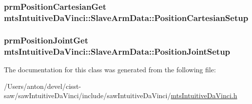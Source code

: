 \subsubsection[{Position\+Cartesian\+Setup}]{\setlength{\rightskip}{0pt plus 5cm}prm\+Position\+Cartesian\+Get mts\+Intuitive\+Da\+Vinci\+::\+Slave\+Arm\+Data\+::\+Position\+Cartesian\+Setup}\label{classmts_intuitive_da_vinci_1_1_slave_arm_data_a09a328a245e9ccf2d482941fba0c76bc}
\hypertarget{classmts_intuitive_da_vinci_1_1_slave_arm_data_a9510d583a4decfbd25c027bf7c1e3e15}{}
\subsubsection[{Position\+Joint\+Setup}]{\setlength{\rightskip}{0pt plus 5cm}prm\+Position\+Joint\+Get mts\+Intuitive\+Da\+Vinci\+::\+Slave\+Arm\+Data\+::\+Position\+Joint\+Setup}\label{classmts_intuitive_da_vinci_1_1_slave_arm_data_a9510d583a4decfbd25c027bf7c1e3e15}


The documentation for this class was generated from the following file\+:\begin{DoxyCompactItemize}
\item 
/\+Users/anton/devel/cisst-\/saw/saw\+Intuitive\+Da\+Vinci/include/saw\+Intuitive\+Da\+Vinci/\hyperlink{mts_intuitive_da_vinci_8h}{mts\+Intuitive\+Da\+Vinci.\+h}\end{DoxyCompactItemize}

